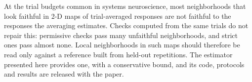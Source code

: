 At the trial budgets common in systems neuroscience, most neighborhoods that look faithful in 2-D
maps of trial-averaged responses are not faithful to the responses the averaging estimates. Checks
computed from the same trials do not repair this: permissive checks pass many unfaithful
neighborhoods, and strict ones pass almost none. Local neighborhoods in such maps should therefore be
read only against a reference built from held-out repetitions. The estimator presented here
provides one, with a conservative bound, and its code, protocols and results are released with the
paper.
